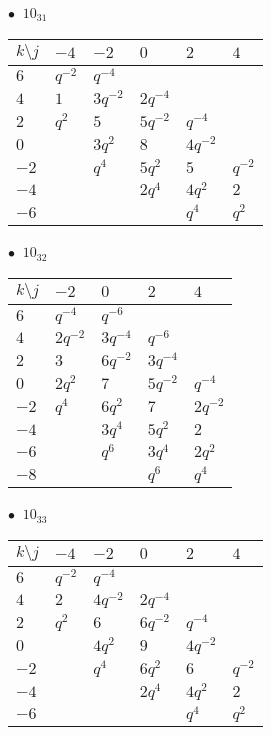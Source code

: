 %
\begin{minipage}{\linewidth}
$\bullet\ $ $10_{31}$ \vspace{0.5em} \\
\begin{tabular}{l|lllll}
$k \setminus j$ & $-4$ & $-2$ & $0$ & $2$ & $4$ \\
\hline
$6$ & $q^{-2}$ & $q^{-4}$ &  &  &  \\
$4$ & $1$ & $3q^{-2}$ & $2q^{-4}$ &  &  \\
$2$ & $q^{2}$ & $5$ & $5q^{-2}$ & $q^{-4}$ &  \\
$0$ &  & $3q^{2}$ & $8$ & $4q^{-2}$ &  \\
$-2$ &  & $q^{4}$ & $5q^{2}$ & $5$ & $q^{-2}$ \\
$-4$ &  &  & $2q^{4}$ & $4q^{2}$ & $2$ \\
$-6$ &  &  &  & $q^{4}$ & $q^{2}$ \\
\end{tabular}
\vspace{2em}
\end{minipage}
%
\begin{minipage}{\linewidth}
$\bullet\ $ $10_{32}$ \vspace{0.5em} \\
\begin{tabular}{l|llll}
$k \setminus j$ & $-2$ & $0$ & $2$ & $4$ \\
\hline
$6$ & $q^{-4}$ & $q^{-6}$ &  &  \\
$4$ & $2q^{-2}$ & $3q^{-4}$ & $q^{-6}$ &  \\
$2$ & $3$ & $6q^{-2}$ & $3q^{-4}$ &  \\
$0$ & $2q^{2}$ & $7$ & $5q^{-2}$ & $q^{-4}$ \\
$-2$ & $q^{4}$ & $6q^{2}$ & $7$ & $2q^{-2}$ \\
$-4$ &  & $3q^{4}$ & $5q^{2}$ & $2$ \\
$-6$ &  & $q^{6}$ & $3q^{4}$ & $2q^{2}$ \\
$-8$ &  &  & $q^{6}$ & $q^{4}$ \\
\end{tabular}
\vspace{2em}
\end{minipage}
%
\begin{minipage}{\linewidth}
$\bullet\ $ $10_{33}$ \vspace{0.5em} \\
\begin{tabular}{l|lllll}
$k \setminus j$ & $-4$ & $-2$ & $0$ & $2$ & $4$ \\
\hline
$6$ & $q^{-2}$ & $q^{-4}$ &  &  &  \\
$4$ & $2$ & $4q^{-2}$ & $2q^{-4}$ &  &  \\
$2$ & $q^{2}$ & $6$ & $6q^{-2}$ & $q^{-4}$ &  \\
$0$ &  & $4q^{2}$ & $9$ & $4q^{-2}$ &  \\
$-2$ &  & $q^{4}$ & $6q^{2}$ & $6$ & $q^{-2}$ \\
$-4$ &  &  & $2q^{4}$ & $4q^{2}$ & $2$ \\
$-6$ &  &  &  & $q^{4}$ & $q^{2}$ \\
\end{tabular}
\vspace{2em}
\end{minipage}
